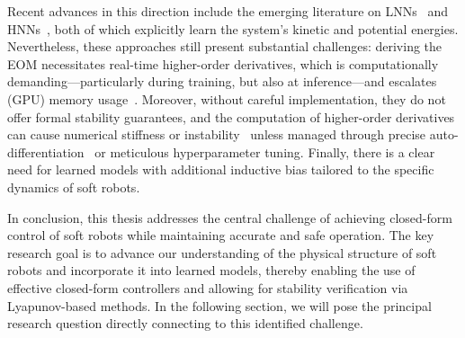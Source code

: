 Recent advances in this direction include the emerging literature on \glspl{LNN}~\citep{lutter2019deep, cranmer2020lagrangian, liu2024physics} and \glspl{HNN}~\citep{greydanus2019hamiltonian, liu2024physics}, both of which explicitly learn the system’s kinetic and potential energies. Nevertheless, these approaches still present substantial challenges: deriving the \gls{EOM} necessitates real-time higher-order derivatives, which is computationally demanding—particularly during training, but also at inference—and escalates (GPU) memory usage~\citep{lutter2019deep}. Moreover, without careful implementation, they do not offer formal stability guarantees, and the computation of higher-order derivatives can cause numerical stiffness or instability~\citep{greydanus2019hamiltonian} unless managed through precise auto-differentiation~\citep{rumelhart1986learning} or meticulous hyperparameter tuning. Finally, there is a clear need for learned models with additional inductive bias tailored to the specific dynamics of soft robots.

In conclusion, this thesis addresses the central challenge of achieving closed-form control of soft robots while maintaining accurate and safe operation. The key research goal is to advance our understanding of the physical structure of soft robots and incorporate it into learned models, thereby enabling the use of effective closed-form controllers and allowing for stability verification via Lyapunov-based methods. In the following section, we will pose the principal research question directly connecting to this identified challenge.

